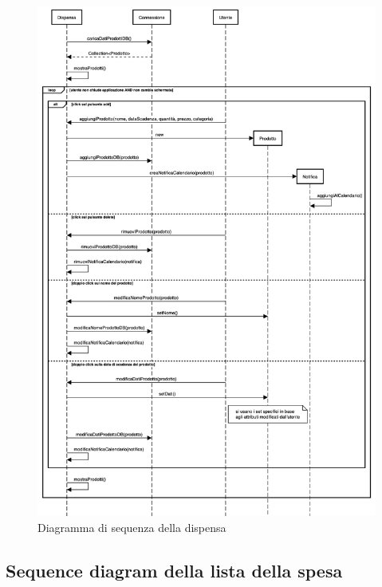 \begin{figure}[H]
    \includegraphics[width=\linewidth]{images/sequence-pantry.png}
    \caption{Diagramma di sequenza della dispensa}
    \label{fig:seqpantry}
\end{figure}

\subsection{Sequence diagram della lista della spesa}

